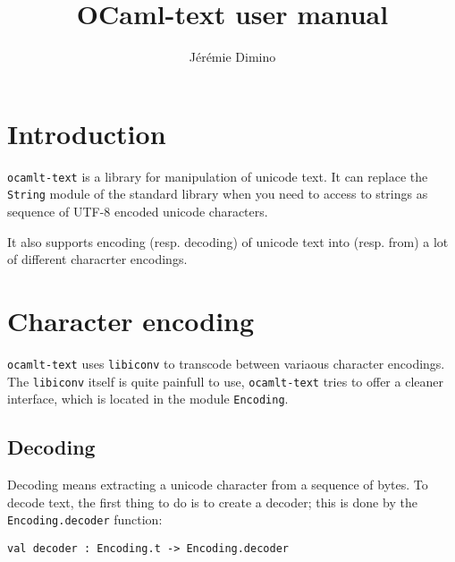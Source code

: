 \documentclass{article}
\title{OCaml-text user manual}
\author{Jérémie Dimino}
\newcommand{\oct}{\texttt{ocamlt-text}\xspace}
\begin{document}
\maketitle


\setcounter{tocdepth}{2}
\tableofcontents

\section{Introduction}

\oct is a library for manipulation of unicode text. It can replace the
\texttt{String} module of the standard library when you need to access
to strings as sequence of UTF-8 encoded unicode characters.

It also supports encoding (resp. decoding) of unicode text into
(resp. from) a lot of different characrter encodings.

\section{Character encoding}

\oct uses \texttt{libiconv} to transcode between variaous character
encodings. The \texttt{libiconv} itself is quite painfull to use, \oct
tries to offer a cleaner interface, which is located in the module
\texttt{Encoding}.

\subsection{Decoding}

Decoding means extracting a unicode character from a sequence of
bytes. To decode text, the first thing to do is to create a decoder;
this is done by the \texttt{Encoding.decoder} function:

\begin{verbatim}
val decoder : Encoding.t -> Encoding.decoder
\end{verbatim}
\end{document}
